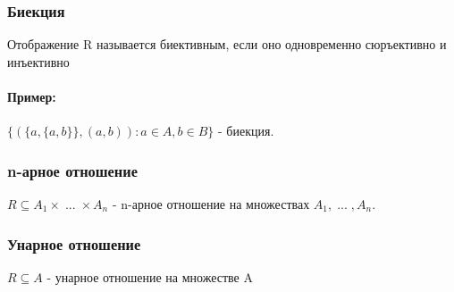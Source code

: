 \subsubsection{Биекция}
Отображение R называется биективным, если оно одновременно сюръективно и инъективно
\paragraph{Пример:}
$\;$ \\ $\{(\{a, \{a, b\}\}, (a, b)) : a \in A, b \in B\}$ - биекция.
\subsubsection{n-арное отношение}
$R \subseteq A_1 \times \; ... \; \times A_n$ - n-арное отношение на множествах $A_1, \; ... \;, A_n$.
\subsubsection{Унарное отношение}
$R \subseteq A$ - унарное отношение на множестве A